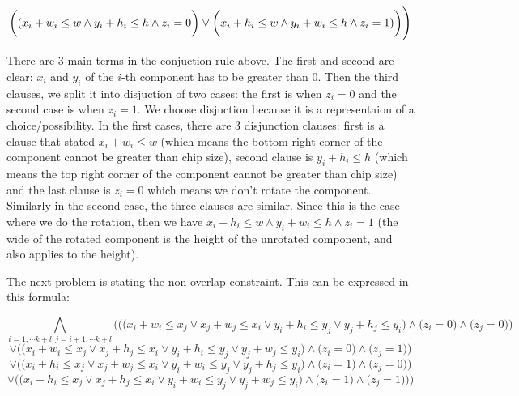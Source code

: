 \documentclass[12pt]{article}
\begin{document}
\[{\bigg((x_i+w_i \leq w \wedge y_i+h_i \leq h \wedge z_i=0\bigg) \vee \\ \bigg(x_i+h_i \leq w \wedge y_i+w_i \leq h \wedge z_i=1)\bigg)\Bigg)} \]


There are 3 main terms in the conjuction rule above. The first and second are clear: $x_i$ and $y_i$ of the $i$-th component has to be greater than 0. Then the third clauses, we split it into disjuction of two cases: the first is when $z_i=0$ and the second case is when $z_i=1$. We choose disjuction because it is a representaion of a choice/possibility. In the first cases, there are 3 disjunction clauses: first is a clause that stated $x_i+w_i \leq w$ (which means the bottom right corner of the component cannot be greater than chip size), second clause is $y_i+h_i \leq h$ (which means the top right corner of the component cannot be greater than chip size) and the last clause is $z_i=0$ which means we don't rotate the component. Similarly in the second case, the three clauses are similar. Since this is the case where we do the rotation, then we have $x_i+h_i \leq w \wedge y_i+w_i \leq h \wedge z_i=1$ (the wide of the rotated component is the height of the unrotated component, and also applies to the height).

The next problem is stating the non-overlap constraint. This can be expressed in this formula:

\[ \bigwedge_{i=1,\cdots k+l; j=i+1,\cdots k+l}{\Bigg(\bigg(\Big(x_i+w_i \leq x_j \vee x_j+w_j \leq x_i \vee y_i+h_i \leq y_j \vee y_j+h_j \leq y_i \Big)  \wedge \Big(z_i=0\Big) \wedge \Big(z_j=0\Big)\bigg) }\]
\[{\vee \bigg(\Big(x_i+w_i \leq x_j \vee x_j+h_j \leq x_i \vee y_i+h_i \leq y_j \vee y_j+w_j \leq y_i \Big)  \wedge \Big(z_i=0\Big) \wedge \Big(z_j=1\Big)\bigg) }\]
\[{\vee \bigg(\Big(x_i+h_i \leq x_j \vee x_j+w_j \leq x_i \vee y_i+w_i \leq y_j \vee y_j+h_j \leq y_i \Big)  \wedge \Big(z_i=1\Big) \wedge \Big(z_j=0\Big)\bigg)}\]
\[{ \vee \bigg(\Big(x_i+h_i \leq x_j \vee x_j+h_j \leq x_i \vee y_i+w_i \leq y_j \vee y_j+w_j \leq y_i \Big)  \wedge \Big(z_i=1\Big) \wedge \Big(z_j=1\Big)\bigg) \Bigg)}\]
\end{document}
